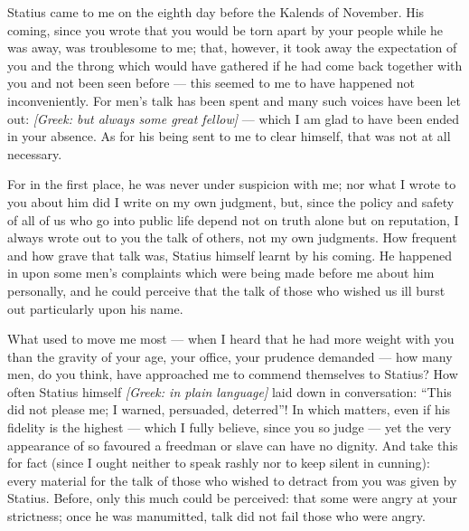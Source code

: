 

 Statius came to me on the eighth day before the Kalends of November. His coming, since you wrote that you would be torn apart by your people while he was away, was troublesome to me; that, however, it took away the expectation of you and the throng which would have gathered if he had come back together with you and not been seen before --- this seemed to me to have happened not inconveniently. For men's talk has been spent and many such voices have been let out: \textit{[Greek: but always some great fellow]} --- which I am glad to have been ended in your absence. As for his being sent to me to clear himself, that was not at all necessary.

 For in the first place, he was never under suspicion with me; nor what I wrote to you about him did I write on my own judgment, but, since the policy and safety of all of us who go into public life depend not on truth alone but on reputation, I always wrote out to you the talk of others, not my own judgments. How frequent and how grave that talk was, Statius himself learnt by his coming. He happened in upon some men's complaints which were being made before me about him personally, and he could perceive that the talk of those who wished us ill burst out particularly upon his name.

 What used to move me most --- when I heard that he had more weight with you than the gravity of your age, your office, your prudence demanded --- how many men, do you think, have approached me to commend themselves to Statius? How often Statius himself \textit{[Greek: in plain language]} laid down in conversation: ``This did not please me; I warned, persuaded, deterred''! In which matters, even if his fidelity is the highest --- which I fully believe, since you so judge --- yet the very appearance of so favoured a freedman or slave can have no dignity. And take this for fact (since I ought neither to speak rashly nor to keep silent in cunning): every material for the talk of those who wished to detract from you was given by Statius. Before, only this much could be perceived: that some were angry at your strictness; once he was manumitted, talk did not fail those who were angry.

